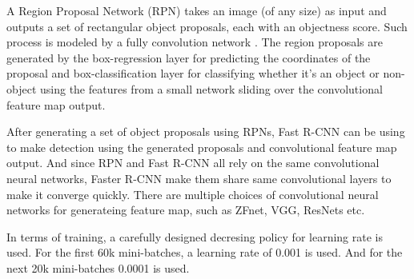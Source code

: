 A Region Proposal Network (RPN) takes an image (of any size) as input and outputs a set of rectangular object proposals, each with an objectness score. Such process is modeled by a fully convolution network \cite{long2015fully}. The region proposals are generated by 
the box-regression layer
for predicting the coordinates of the proposal
and box-classification layer for 
classifying whether it's an object or non-object 
using the features from a small network sliding over the convolutional feature map output. 

After generating a set of object proposals using RPNs, Fast R-CNN can be using to make detection using the generated proposals and convolutional feature map output. And since RPN and Fast R-CNN all rely on the same convolutional neural networks, Faster R-CNN make them share same convolutional layers to make it converge quickly. 
There are multiple choices of 
convolutional neural networks for generateing feature map, such as 
ZFnet, VGG, ResNets etc.

In terms of training, a carefully designed decresing policy for learning rate is used. For the first 60k mini-batches, a learning rate of 0.001 is used. And for the next 20k mini-batches 0.0001 is used.


